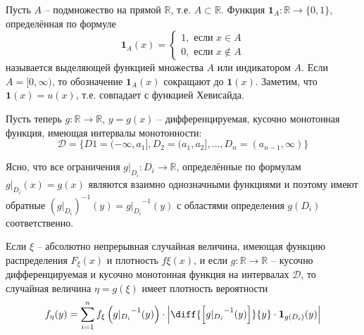 \begin{definition}
\label{def:14.3}
Пусть $A$ – подмножество на прямой $\mathbb{R}$, т.е. $A \subset
\mathbb{R}$. Функция $\mathbf{1}_A :\mathbb{R} \to \{0, 1\}$, определённая по формуле
\begin{equation*}
	\mathbf{1}_A (x)=\left\{
	\begin{aligned}
		1, \text{ если } x\in A\\
		0, \text{ если } x\notin A
	\end{aligned}
	\right.
\end{equation*}
называется выделяющей функцией множества $A$ или индикатором $A$.
Если $A = [0, \infty)$, то обозначение $\mathbf{1}_A(x)$ сокращают до $\mathbf{1}(x)$. Заметим, что $\mathbf{1}(x) = u(x)$, т.е. совпадает с функцией Хевисайда.	
\end{definition}

\begin{zam}
Пусть теперь $g : \mathbb{R} \to \mathbb{R}$, $y = g(x)$ -- дифференцируемая, кусочно монотонная функция, имеющая интервалы монотонности:
\begin{equation*}
	\mathcal{D}=\{D1=(-\infty, a_1], D_2 = (a_1 , a_2 ], \ldots , D_n = (a_{n-1} , \infty)\} 
\end{equation*}

Ясно, что все ограничения $g|_{D_i} : D_i \to \mathbb{R}$, определённые по формулам $g|_{D_i}(x)=g(x)$ являются взаимно однозначными функциями и поэтому имеют обратные $\left(g|_{D_i}\right)^{-1}(y)={g|_{D_i}}^{-1}(y)$ с областями определения $g(D_i)$ соответственно.
\end{zam}

\begin{theorem}
	\label{th:14.5}
Если $\xi $ -- абсолютно непрерывная случайная величина, имеющая функцию распределения $F_\xi (x)$ и плотность $f\xi (x)$, и если $g : \mathbb{R} \to \mathbb{R}$ -- кусочно дифференцируемая и кусочно монотонная функция на интервалах $\mathcal{D}$, то случайная величина $\eta = g(\xi)$ имеет плотность вероятности
\begin{equation*}
	f_\eta(y)=\sum\limits_{i=1}^n f_\xi\left(
		{g|_{D_i}}^{-1}(y)
	\right)\cdot
	\left|
		\diff{\left[ {g|_{D_i}}^{-1}(y) \right]}{y}\cdot\mathbf{1}_{g(D_i)}(y)
	\right|
\end{equation*}

\end{theorem}
